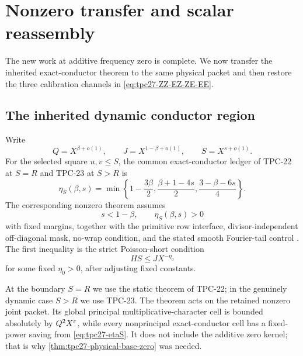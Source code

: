 \section{Nonzero transfer and scalar reassembly}
\label{sec:tpc27-nonzero-scalar}

The new work at additive frequency zero is complete.  We now transfer
the inherited exact-conductor theorem to the same physical packet and
then restore the three calibration channels in
\eqref{eq:tpc27-ZZ-EZ-ZE-EE}.

\subsection{The inherited dynamic conductor region}

Write
\begin{equation}
 Q=X^{\beta+o(1)},
 \qquad J=X^{1-\beta+o(1)},
 \qquad S=X^{s+o(1)}.
 \label{eq:tpc27-base-exponents}
\end{equation}
For the selected square \(u,v\le S\), the common exact-conductor
ledger of TPC-22 at \(S=R\) and TPC-23 at \(S>R\) is
\begin{equation}
 \eta_S(\beta,s)
 =\min\left\{
 1-\frac{3\beta}{2},
 \frac{\beta+1-4s}{2},
 \frac{3-\beta-6s}{4}
 \right\}.
 \label{eq:tpc27-etaS}
\end{equation}
The corresponding nonzero theorem assumes
\begin{equation}
 s<1-\beta,
 \qquad \eta_S(\beta,s)>0
 \label{eq:tpc27-dynamic-region}
\end{equation}
with fixed margins, together with the primitive row interface,
divisor-independent off-diagonal mask, no-wrap condition, and the
stated smooth Fourier-tail control
\citep{WangTPC23}.  The first inequality is the strict Poisson-short
condition
\begin{equation}
 HS\le JX^{-\eta_0}
 \label{eq:tpc27-Poisson-short}
\end{equation}
for some fixed \(\eta_0>0\), after adjusting fixed constants.

At the boundary \(S=R\) we use the static theorem of TPC-22; in the
genuinely dynamic case \(S>R\) we use TPC-23.  The theorem acts on the
retained nonzero joint packet.  Its global
principal multiplicative-character cell is bounded absolutely by
\(Q^2X^\varepsilon\), while every nonprincipal exact-conductor cell has a
fixed-power saving from \eqref{eq:tpc27-etaS}.  It does not include the
additive zero kernel; that is why
\cref{thm:tpc27-physical-base-zero} was needed.

